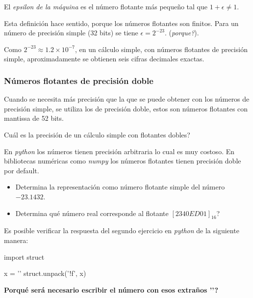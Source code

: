 \documentclass[spanish]{amsart}
\begin{document}
\begin{definition}
  El \emph{epsilon de la máquina} es el número flotante más pequeño tal que $1 + \epsilon \neq 1$.
\end{definition}

Esta definición hace sentido, porque los números flotantes son finitos. Para un número de precisión simple (32 bits) se tiene $\epsilon = 2^{-23}$. (\emph{porque?}).

\begin{remark}
  Como $2^{-23} \approx 1.2 \times 10^{-7}$, en un cálculo simple, con números flotantes de precisión simple, aproximadamente se obtienen seis cifras decimales exactas.
\end{remark}

\subsubsection{Números flotantes de precisión doble}

Cuando se necesita más precisión que la que se puede obtener con los números de precisión simple, se utiliza los de precisión doble, estos son números flotantes con mantissa de 52 bits. 

\begin{exercise}
  Cuál es la precisión de un cálculo simple con flotantes dobles?
\end{exercise}

\begin{remark}
  En \emph{python} los números tienen precisión arbitraria lo cual es muy costoso. En bibliotecas numéricas como \emph{numpy} los números flotantes tienen precisión doble por default.
\end{remark}

\begin{exercise}
  \begin{itemize}
  \item Determina la representación como número flotante simple del número $-23.1432$.
  \item Determina qué número real corresponde al flotante $[2340ED01]_{16}$?
  \end{itemize}
\end{exercise}

\begin{remark}
  Es posible verificar la respuesta del segundo ejercicio en \emph{python} de la siguiente manera:

  \begin{pythoncode}
    import struct

    x = '\xED{}'
    struct.unpack('!f', x)
  \end{pythoncode}

\textbf{Porqué será necesario escribir el número con esos extraños '\x'?}
\end{remark}

\nocite{*}
{}

\end{document}
